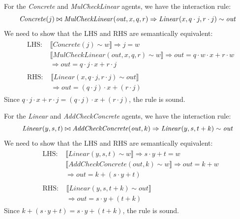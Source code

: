 \begin{lemma}
	For the \textit{Concrete} and \textit{MulCheckLinear} agents, we have the interaction rule:
	$$
	\mathit{Concrete}(j) \bowtie \mathit{MulCheckLinear}(\mathit{out}, x, q, r) \Rightarrow \mathit{Linear}(x, q \cdot j, r \cdot j) \sim \mathit{out} \\
	$$
	We need to show that the LHS and RHS are semantically equivalent:
	$$
	\begin{aligned}
		& \begin{aligned}
			\text{LHS: } & \llbracket \mathit{Concrete}(j) \sim w \rrbracket \Rightarrow j = w \\
			& \llbracket \mathit{MulCheckLinear}(\mathit{out}, x, q, r) \sim w \rrbracket \Rightarrow \mathit{out} = q \cdot w \cdot x + r \cdot w \\
			& \Rightarrow \mathit{out} = q \cdot j \cdot x + r \cdot j
		\end{aligned} \\
		& \begin{aligned}
			\text{RHS: } & \llbracket \mathit{Linear}(x, q \cdot j, r \cdot j) \sim \mathit{out} \rrbracket \\
			& \Rightarrow \mathit{out} = (q \cdot j) \cdot x + (r \cdot j)
		\end{aligned}
	\end{aligned}
	$$
	Since $q \cdot j \cdot x + r \cdot j = (q \cdot j) \cdot x + (r \cdot j)$, the rule is sound.
\end{lemma}

\begin{lemma}
	For the \textit{Linear} and \textit{AddCheckConcrete} agents, we have the interaction rule:
	$$
	\mathit{Linear}(y, s, t) \bowtie \mathit{AddCheckConcrete}(\mathit{out}, k) \Rightarrow \mathit{Linear}(y, s, t + k) \sim \mathit{out} \\
	$$
	We need to show that the LHS and RHS are semantically equivalent:
	$$
	\begin{aligned}
		& \begin{aligned}
			\text{LHS: } & \llbracket \mathit{Linear}(y, s, t) \sim w \rrbracket \Rightarrow s \cdot y + t = w \\
			& \llbracket \mathit{AddCheckConcrete}(\mathit{out}, k) \sim w \rrbracket \Rightarrow \mathit{out} = k + w \\
			& \Rightarrow \mathit{out} = k + (s \cdot y + t)
		\end{aligned} \\
		& \begin{aligned}
			\text{RHS: } & \llbracket \mathit{Linear}(y, s, t + k) \sim \mathit{out} \rrbracket \\
			& \Rightarrow \mathit{out} = s \cdot y + (t + k)
		\end{aligned}
	\end{aligned}
	$$
	Since $k + (s \cdot y + t) = s \cdot y + (t + k)$, the rule is sound.
\end{lemma}

